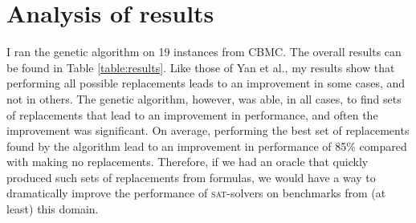 \documentclass[proof,pdftex,11pt,a4,titlepage]{article}
\newcommand{\sat}{\textsc{sat}}
\begin{document}
\section{Analysis of results}

I ran the genetic algorithm on 19 instances from CBMC. The overall results can be found in Table \ref{table:results}. Like those of Yan et al., my results show that performing all possible replacements leads to an improvement in some cases, and not in others. The genetic algorithm, however, was able, in all cases, to find sets of replacements that lead to an improvement in performance, and often the improvement was significant. On average, performing the best set of replacements found by the algorithm lead to an improvement in performance of 85\% compared with making no replacements. Therefore, if we had an oracle that quickly produced such sets of replacements from formulas, we would have a way to dramatically improve the performance of \sat{}-solvers on benchmarks from (at least) this domain.
\end{document}
